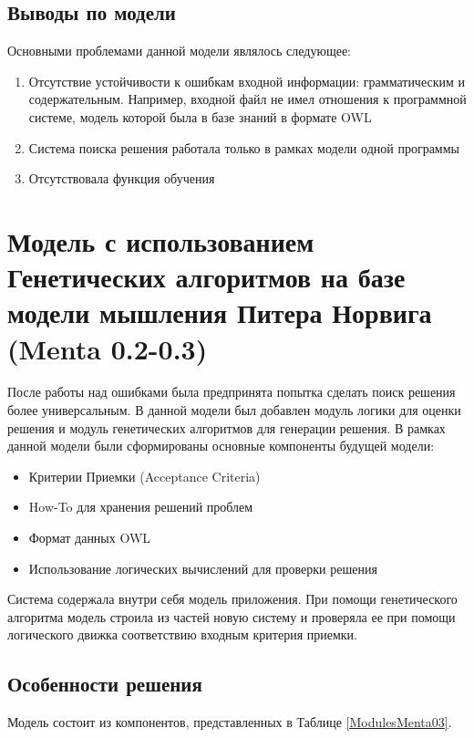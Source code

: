\subsection{Выводы по модели}
Основными проблемами данной модели являлось следующее:
\begin{enumerate}
	\item Отсутствие устойчивости к ошибкам входной информации: грамматическим и содержательным. Например, входной файл не имел отношения к программной системе, модель которой была в базе знаний в формате OWL
	\item Система поиска решения работала только в рамках модели одной программы
	\item Отсутствовала функция обучения 
\end{enumerate}

\section{Модель с использованием Генетических алгоритмов на базе модели мышления Питера Норвига (Menta 0.2-0.3)}
После работы над ошибками была предпринята попытка сделать поиск решения более универсальным. В данной модели был добавлен модуль логики для оценки решения и модуль генетических алгоритмов для генерации решения. В рамках данной модели были сформированы основные компоненты будущей модели:
\begin{itemize}
	\item Критерии Приемки (Acceptance Criteria)
	\item How-To для хранения решений проблем
	\item Формат данных OWL 
	\item Использование логических вычислений для проверки решения
\end{itemize}
Система содержала внутри себя модель приложения. При помощи генетического алгоритма модель строила из частей новую систему и проверяла ее при помощи логического движка \cite{NARS} соответствию входным критерия приемки. 
\subsection{Особенности решения}
Модель состоит из компонентов, представленных в Таблице \ref{ModulesMenta03}.

